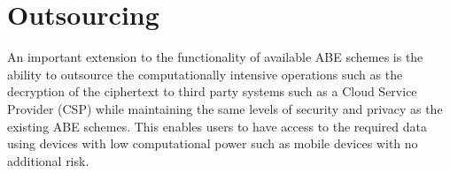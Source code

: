 


\section{Outsourcing}

An important extension to the functionality of available ABE schemes is the ability to outsource the computationally intensive operations such as the decryption of the ciphertext to third party systems such as a Cloud Service Provider (CSP) while maintaining the same levels of security and privacy as the existing ABE schemes. This enables users to have access to the required data using devices with low computational power such as mobile devices with no additional risk.

